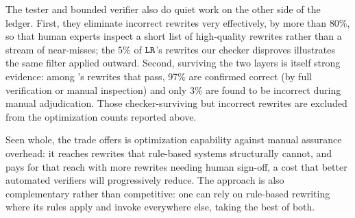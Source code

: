 The tester and bounded verifier also do quiet work on the other side
of the ledger. First, they eliminate incorrect rewrites very
effectively, by more than 80\%, so that human experts inspect a short
list of high-quality rewrites rather than a stream of near-misses; the
5\% of $\texttt{LR}$'s rewrites our checker disproves illustrates the same
filter applied outward. Second, surviving the two layers is itself
strong evidence: among \toolname's rewrites that pass, 97\% are
confirmed correct (by full verification or manual inspection) and only
3\% are found to be incorrect during manual adjudication. Those
checker-surviving but incorrect rewrites are excluded from the
optimization counts reported above.

Seen whole, the trade \toolname offers is optimization capability
against manual assurance overhead: it reaches rewrites that rule-based
systems structurally cannot, and pays for that reach with more
rewrites needing human sign-off, a cost that better automated
verifiers will progressively reduce. The approach is also
complementary rather than competitive: one can rely on rule-based
rewriting where its rules apply and invoke \toolname everywhere else,
taking the best of both.

